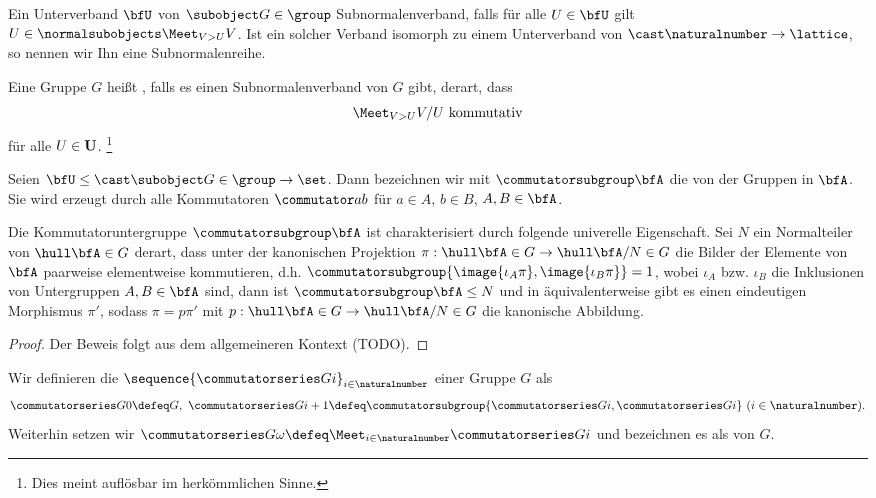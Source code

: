 \begin{definition}
    Ein Unterverband $\bfU$ von $\subobject G\in\group$ Subnormalenverband, falls für alle $U\in \bfU$ gilt
    $U\in\normalsubobjects \Meet_{V>U}V$. Ist ein solcher Verband isomorph zu einem Unterverband von $\cast \naturalnumber \to \lattice$, so nennen wir Ihn
    eine Subnormalenreihe. 
\end{definition}

\begin{definition}
    Eine Gruppe $G$ heißt , falls es einen Subnormalenverband von $G$ gibt, derart, dass
    $$
    \Meet_{V>U} V / U\ \textrm{kommutativ}
    $$
    für alle $U\in\bf U$. \footnote{Dies meint auflösbar im herkömmlichen Sinne.}
\end{definition}

\begin{definition}[Kommutatoruntergruppe]
    Seien $\bfU\leq\cast \subobject G\in\group\to \set$. Dann bezeichnen wir mit $\commutatorsubgroup \bfA$ die
     von der Gruppen in $\bfA$. Sie wird erzeugt durch alle Kommutatoren $\commutator a b$ für $a\in
    A$, $b\in B$, $A,B\in\bfA$. 
\end{definition}

\begin{lemma}
    Die Kommutatoruntergruppe $\commutatorsubgroup \bfA$ ist charakterisiert durch folgende univerelle Eigenschaft.
    Sei $N$ ein Normalteiler von $\hull\bfA\in G$ derart, dass unter der kanonischen Projektion
    $\pi:\hull\bfA\in G\to\hull\bfA/N\in G$ die
    Bilder der Elemente von $\bfA$ paarweise elementweise kommutieren, d.h. $\commutatorsubgroup
    {\image{\iota_A\pi},\image{\iota_B\pi}}=1$, wobei $\iota_A$ bzw. $\iota_B$ die Inklusionen von Untergruppen $A,B\in\bfA$ sind,
    dann ist $\commutatorsubgroup \bfA\leq N$ und in äquivalenterweise gibt es einen eindeutigen Morphismus $\pi'$, sodass
    $\pi=p\pi'$ mit $p:\hull\bfA\in G\to\hull\bfA/N\in G$ die kanonische Abbildung.
\end{lemma}

\begin{proof}
    Der Beweis folgt aus dem allgemeineren Kontext (TODO).
\end{proof}

\begin{definition}[Kommutatorreihe]
    Wir definieren die  $\sequence{\commutatorseries G i}_{i\in \naturalnumber}$ einer Gruppe $G$ als
    $$\commutatorseries G 0 \defeq G,\ \commutatorseries G {i+1} \defeq \commutatorsubgroup {\commutatorseries G i,\commutatorseries G i} \ (i\in\naturalnumber).$$
    Weiterhin setzen wir $\commutatorseries G \omega \defeq \Meet_{i\in\naturalnumber} \commutatorseries G i$ und bezeichnen es als
     von $G$.
\end{definition}

